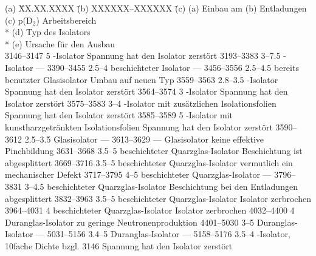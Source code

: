 \begin{tabbing}
(a) \=XX.XX.XXXX \=(b) XXXXXX--XXXXXX \=(c) \kill
    (a) \> Einbau am \>(b) Entladungen \>(c) p(D$_2$) Arbeitsbereich\\*
    \>(d) Typ des Isolators\\*
    \>(e) Ursache für den Ausbau\\[0pt plus 10pt]
    {3146--3147}
    {5}
    {\AlO-Isolator}
    {Spannung hat den Isolator zerstört}
    {3193--3383}
    {3--7.5}
    {\AlO-Isolator}
    {---}
    {3390--3455}
    {2.5--4}
    {\AlO beschichteter Isolator}
    {---}
    {3456--3556}
    {2.5--4.5}
    {bereits benutzter Glasisolator}
    {Umbau auf neuen Typ}
    {3559--3563}
    {2.8--3.5}
    {\AlO-Isolator}
    {Spannung hat den Isolator zerstört}
    {3564--3574}
    {3}
    {\AlO-Isolator}
    {Spannung hat den Isolator zerstört}
    {3575--3583}
    {3--4}
    {\AlO-Isolator mit zusätzlichen Isolationsfolien}
    {Spannung hat den Isolator zerstört}
    {3585--3589}
    {5}
    {\AlO-Isolator mit kunstharzgetränkten Isolationsfolien}
    {Spannung hat den Isolator zerstört}
    {3590--3612}
    {2.5--3.5}
    {Glasisolator}
    {---}
    {3613--3629}
    {---}
    {Glasisolator}
    {keine effektive Pinchbildung}
    {3631--3668}
    {3.5--5}
    {\AlO beschichteter Quarzglas-Isolator}
    {Beschichtung ist abgesplittert}
    {3669--3716}
    {3.5--5}
    {\AlO beschichteter Quarzglas-Isolator}
    {vermutlich ein mechanischer Defekt}
    {3717--3795}
    {4--5}
    {\AlO beschichteter Quarzglas-Isolator}
    {---}
    {3796--3831}
    {3--4.5}
    {\AlO beschichteter Quarzglas-Isolator}
    {Beschichtung bei den Entladungen abgesplittert}
    {3832--3963}
    {3.5--5}
    {\AlO beschichteter Quarzglas-Isolator}
    {Isolator zerbrochen}
    {3964--4031}
    {4}
    {\AlO beschichteter Quarzglas-Isolator}
    {Isolator zerbrochen}
    {4032--4400}
    {4}
    {Duranglas-Isolator}
    {zu geringe Neutronenproduktion}
    {4401--5030}
    {3--5}
    {Duranglas-Isolator}
    {---}
    {5031--5156}
    {3.4--5}
    {Duranglas-Isolator}
    {---}
    {5158--5176}
    {3.5--4}
    {\AlO-Isolator, 10fache Dichte bzgl. 3146}
    {Spannung hat den Isolator zerstört}

\end{tabbing}
